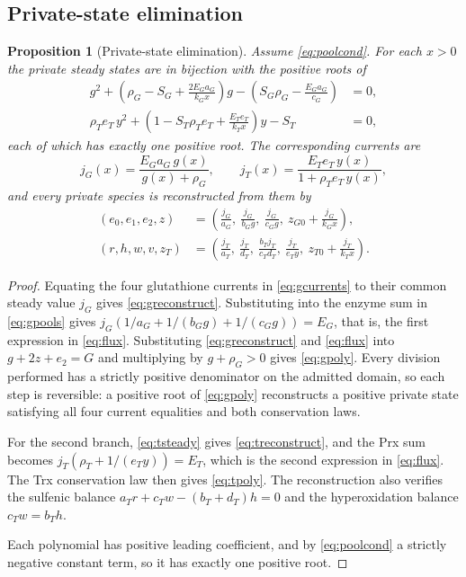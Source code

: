 \documentclass[11pt,a4paper]{article}
\theoremstyle{plain}
\newtheorem{proposition}[theorem]{Proposition}
\theoremstyle{definition}
\theoremstyle{remark}
\begin{document}
\subsection{Private-state elimination}

\begin{proposition}[Private-state elimination]\label{prop:elimination}
Assume \eqref{eq:poolcond}. For each $x>0$ the private steady states are in
bijection with the positive roots of
\begin{align}
  g^2+\left(\rho_G-S_G+\frac{2E_Ga_G}{k_Gx}\right)g
    -\left(S_G\rho_G-\frac{E_Ga_G}{c_G}\right)&=0,\label{eq:gpoly}\\[2pt]
  \rho_Te_T\,y^2+\left(1-S_T\rho_Te_T+\frac{E_Te_T}{k_Tx}\right)y-S_T&=0,
  \label{eq:tpoly}
\end{align}
each of which has exactly one positive root. The corresponding currents are
\begin{equation}\label{eq:flux}
  j_G(x)=\frac{E_Ga_G\,g(x)}{g(x)+\rho_G},\qquad
  j_T(x)=\frac{E_Te_T\,y(x)}{1+\rho_Te_T\,y(x)},
\end{equation}
and every private species is reconstructed from them by
\begin{align}
  (e_0,e_1,e_2,z)&=\left(\frac{j_G}{a_G},\ \frac{j_G}{b_Gg},\ \frac{j_G}{c_Gg},\
    z_{G0}+\frac{j_G}{k_Gx}\right),\label{eq:greconstruct}\\
  (r,h,w,v,z_T)&=\left(\frac{j_T}{a_T},\ \frac{j_T}{d_T},\ \frac{b_Tj_T}{c_Td_T},\
    \frac{j_T}{e_Ty},\ z_{T0}+\frac{j_T}{k_Tx}\right).\label{eq:treconstruct}
\end{align}
\end{proposition}

\begin{proof}
Equating the four glutathione currents in \eqref{eq:gcurrents} to their common
steady value $j_G$ gives \eqref{eq:greconstruct}. Substituting into the enzyme sum
in \eqref{eq:gpools} gives $j_G(1/a_G+1/(b_Gg)+1/(c_Gg))=E_G$, that is, the first
expression in \eqref{eq:flux}. Substituting \eqref{eq:greconstruct} and
\eqref{eq:flux} into $g+2z+e_2=G$ and multiplying by $g+\rho_G>0$ gives
\eqref{eq:gpoly}. Every division performed has a strictly positive denominator on
the admitted domain, so each step is reversible: a positive root of
\eqref{eq:gpoly} reconstructs a positive private state satisfying all four current
equalities and both conservation laws.

For the second branch, \eqref{eq:tsteady} gives \eqref{eq:treconstruct}, and the
Prx sum becomes $j_T(\rho_T+1/(e_Ty))=E_T$, which is the second expression in
\eqref{eq:flux}. The Trx conservation law then gives \eqref{eq:tpoly}. The
reconstruction also verifies the sulfenic balance
$a_Tr+c_Tw-(b_T+d_T)h=0$ and the hyperoxidation balance $c_Tw=b_Th$.

Each polynomial has positive leading coefficient, and by \eqref{eq:poolcond} a
strictly negative constant term, so it has exactly one positive root.
\end{proof}
\end{document}
